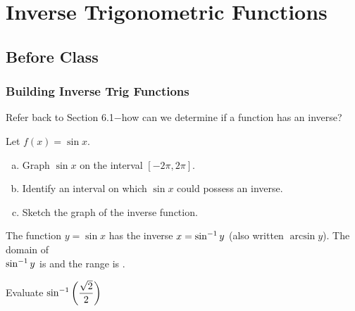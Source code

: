 \documentclass[notes]{subfiles}
\begin{document}
	\setcounter{section}{6}
	\setcounter{ex}{0}
	\fancyhead[LO,RE]{\bfseries \small \currentname}
	\fancyfoot[C]{{}}
	\fancyfoot[RO,LE]{\large \thepage}	%
	
\section*{Inverse Trigonometric Functions}\label{cs66}
	\subsection*{Before Class}
	\subsubsection*{Building Inverse Trig Functions}
		\begin{question}
			Refer back to Section 6.1$-$how can we determine if a function has an inverse?
		\end{question}
			
		\begin{ex}
			Let $f(x) = \sin x$.
			\begin{enumerate}[(a)]
				\item Graph $\sin x$ on the interval $[-2\pi,2\pi]$.
					
				\item Identify an interval on which $\sin x$ could possess an inverse.
				
				\item Sketch the graph of the inverse function.
			\end{enumerate}
		\end{ex}
		\begin{rmk}
			The function $y = \sin x$ has the inverse $x = \sin^{-1}y$ (also written $\arcsin y$).  The domain of \\[20pt] $\sin^{-1}y$ is  and the range is \blank{2.5}.
		\end{rmk}
		\newpage
		
		\begin{ex}
			Evaluate $\sin^{-1}\left( \dfrac{\sqrt{2}}{2}\right)$
		\end{ex}
			
\end{document}
